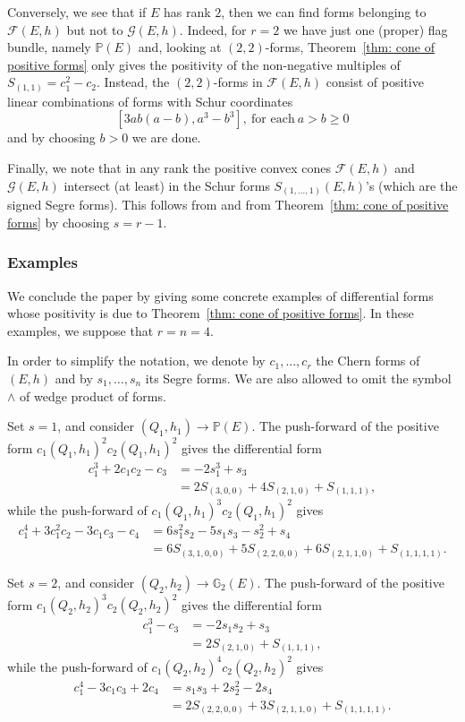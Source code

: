 \documentclass[a4paper]{amsart}
\theoremstyle{plain}%
\theoremstyle{definition}
\theoremstyle{remark}
\newcommand{\PP}{\mathbb{P}}
\newcommand{\GG}{\mathbb{G}}
\begin{document}
Conversely, we see that if $ E $ has rank $ 2 $, then we can find forms belonging to $ \mathcal{F}(E,h) $ but not to $ \mathcal{G}(E,h) $.
Indeed, for $ r=2 $ we have just one (proper) flag bundle, namely $ \PP(E) $ and, looking at $ (2,2) $-forms, Theorem~\ref{thm: cone of positive forms} only gives the positivity of the non-negative multiples of $ S_{(1,1)} = c_1^2 - c_2 $.
Instead, the $ (2,2) $-forms in $ \mathcal{F}(E,h) $ consist of positive linear combinations of forms with Schur coordinates
\[
[3ab(a-b), a^3 - b^3], \ \text{for each} \  a > b \ge 0
\]
and by choosing $ b>0 $ we are done.

Finally, we note that in any rank the positive convex cones $ \mathcal{F}(E,h) $ and $ \mathcal{G}(E,h) $ intersect (at least) in the Schur forms $ S_{(1,\dots,1)}(E,h) $'s (which are the signed Segre forms).
This follows from \cite[Section~{4.1.1}]{DF20} and from Theorem~\ref{thm: cone of positive forms} by choosing $ s=r-1 $.

\subsubsection{Examples}
We conclude the paper by giving some concrete examples of differential forms whose positivity is due to Theorem~\ref{thm: cone of positive forms}.
In these examples, we suppose that $ r = n = 4 $.

In order to simplify the notation, we denote by $ c_1,\dots,c_r $ the Chern forms of $ (E,h) $ and by $ s_1,\dots,s_n $ its Segre forms.
We are also allowed to omit the symbol $ \wedge $ of wedge product of forms.

Set $ s=1 $, and consider $ (Q_1,h_1) \to \PP(E) $.
The push-forward of the positive form $ {c_1(Q_1,h_1)}^{2}  {c_2(Q_1,h_1)}^{2} $ gives the differential form
\begin{align*}
c_1^3 + 2c_1c_2 - c_3 &= -2 s_1^3 + s_3 \\
&= 2S_{(3,0,0)} + 4S_{(2,1,0)} + S_{(1,1,1)} ,
\end{align*}
while the push-forward of $ {c_1(Q_1,h_1)}^{3}  {c_2(Q_1,h_1)}^{2} $ gives
\begin{align*}
	c_1^4 + 3c_1^2c_2 - 3c_1c_3 -c_4 &= 6s_1^2s_2 - 5s_1s_3 -s_2^2 +s_4 \\
	&= 6S_{(3,1,0,0)} +5S_{(2,2,0,0)} + 6S_{(2,1,1,0)} +S_{(1,1,1,1)} .
\end{align*}

Set $ s=2 $, and consider $ (Q_2,h_2) \to \GG_{2}(E) $.
The push-forward of the positive form $ {c_1(Q_2,h_2)}^{3}  {c_2(Q_2,h_2)}^{2} $ gives the differential form
\begin{align*}
	c_1^3 - c_3 &= -2 s_1s_2 + s_3 \\
	&= 2S_{(2,1,0)} + S_{(1,1,1)} ,
\end{align*}
while the push-forward of $ {c_1(Q_2,h_2)}^{4}  {c_2(Q_2,h_2)}^{2} $ gives
\begin{align*}
	c_1^4 - 3c_1c_3 + 2c_4 &= s_1s_3 +2s_2^2 -2s_4 \\
	&= 2S_{(2,2,0,0)} + 3S_{(2,1,1,0)} +S_{(1,1,1,1)} .
\end{align*}
\end{document}
